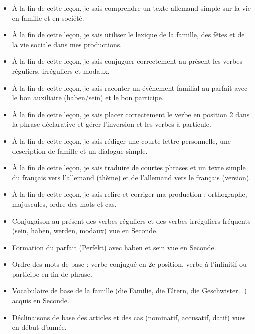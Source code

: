 \documentclass[11pt]{article}
\begin{document}
\begin{objectifs}
\begin{itemize}
\item À la fin de cette leçon, je sais comprendre un texte allemand simple sur la vie en famille et en société.
\item À la fin de cette leçon, je sais utiliser le lexique de la famille, des fêtes et de la vie sociale dans mes productions.
\item À la fin de cette leçon, je sais conjuguer correctement au présent les verbes réguliers, irréguliers et modaux.
\item À la fin de cette leçon, je sais raconter un événement familial au parfait avec le bon auxiliaire (haben/sein) et le bon participe.
\item À la fin de cette leçon, je sais placer correctement le verbe en position 2 dans la phrase déclarative et gérer l'inversion et les verbes à particule.
\item À la fin de cette leçon, je sais rédiger une courte lettre personnelle, une description de famille et un dialogue simple.
\item À la fin de cette leçon, je sais traduire de courtes phrases et un texte simple du français vers l'allemand (thème) et de l'allemand vers le français (version).
\item À la fin de cette leçon, je sais relire et corriger ma production : orthographe, majuscules, ordre des mots et cas.
\end{itemize}
\end{objectifs}

\begin{prerequis}
\begin{itemize}
\item Conjugaison au présent des verbes réguliers et des verbes irréguliers fréquents (sein, haben, werden, modaux) vue en Seconde.
\item Formation du parfait (Perfekt) avec haben et sein vue en Seconde.
\item Ordre des mots de base : verbe conjugué en 2e position, verbe à l'infinitif ou participe en fin de phrase.
\item Vocabulaire de base de la famille (die Familie, die Eltern, die Geschwister...) acquis en Seconde.
\item Déclinaisons de base des articles et des cas (nominatif, accusatif, datif) vues en début d'année.
\end{itemize}
\end{prerequis}
\end{document}
